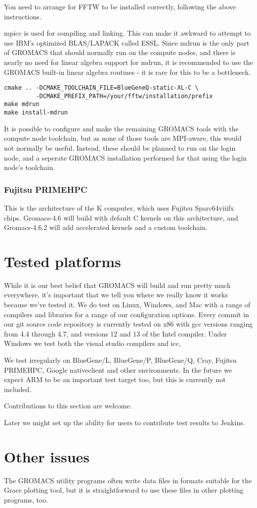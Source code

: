 \documentclass{article}[12pt,a4paper,twoside]
\newcommand{\gromacs}{GROMACS}
\newcommand{\mpi}{MPI}
\newcommand{\grace}{Grace}
\begin{document}
You need to arrange for FFTW to be installed correctly, following the
above instructions.

mpicc is used for compiling and linking. This can make it awkward to
attempt to use IBM's optimized BLAS/LAPACK called ESSL. Since mdrun is
the only part of \gromacs{} that should normally run on the compute
nodes, and there is nearly no need for linear algebra support for
mdrun, it is recommended to use the \gromacs{} built-in linear algebra
routines - it is rare for this to be a bottleneck.

\begin{verbatim}
cmake .. -DCMAKE_TOOLCHAIN_FILE=BlueGeneQ-static-XL-C \
         -DCMAKE_PREFIX_PATH=/your/fftw/installation/prefix
make mdrun
make install-mdrun
\end{verbatim}
It is possible to configure and make the remaining \gromacs{} tools
with the compute node toolchain, but as none of those tools are
\mpi{}-aware, this would not normally be useful. Instead, these should
be planned to run on the login node, and a seperate \gromacs{}
installation performed for that using the login node's toolchain.

\subsubsection{Fujitsu PRIMEHPC}

This is the architecture of the K computer, which uses Fujitsu Sparc64viiifx 
chips. Gromacs-4.6 will build with default C kernels on this architecture,
and Gromacs-4.6.2 will add accelerated kernels and a custom toolchain.

\section{Tested platforms}

While it is our best belief that \gromacs{} will build and run pretty
much everywhere, it's important that we tell you where we really know
it works because we've tested it. We do test on Linux, Windows, and
Mac with a range of compilers and libraries for a range of our
configuration options. Every commit in our git source code
repository is currently tested on x86 with gcc versions ranging
from 4.4 through 4.7, and versions 12 and 13 of the Intel compiler.
Under Windows we test both the visual studio compilers and icc,

We test irregularly on BlueGene/L, BlueGene/P, BlueGene/Q, Cray, 
Fujitsu PRIMEHPC, Google nativeclient and other environments. In 
the future we expect ARM to be an important test target too, but this
is currently not included.

Contributions to this section are welcome.

Later we might set up the ability for users to contribute test results
to Jenkins.

\section{Other issues}

The \gromacs{} utility programs often write data files in formats
suitable for the \grace{} plotting tool, but it is straightforward to
use these files in other plotting programs, too.
\end{document}
